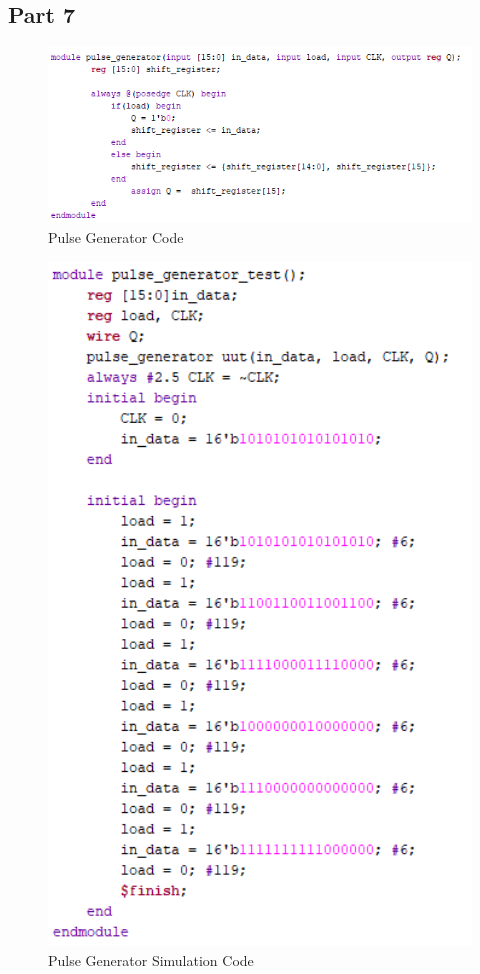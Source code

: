 \documentclass[pdftex,12pt,a4paper]{article}
\theoremstyle{plain}
\begin{document}
\subsection{Part 7}
\begin{figure}[H]
	\centering
	\includegraphics[width=1\textwidth]{codes/code-Pulse Generator.png}
	\caption{Pulse Generator Code}
	\label{fig7}
    \end{figure}
\begin{figure}[H]
	\centering
	\includegraphics[width=1\textwidth]{codes/code-Pulse Generator Sim.png}
	\caption{Pulse Generator Simulation Code}
	\label{fig7}
    \end{figure}
\end{document}
